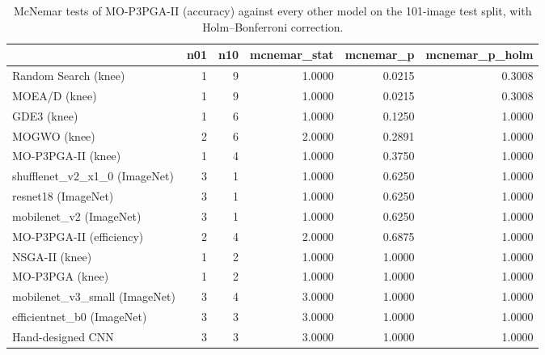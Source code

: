 \begin{table}[htbp]
\centering
\caption{McNemar tests of MO-P3PGA-II (accuracy) against every other model on the 101-image test split, with Holm--Bonferroni correction.}
\label{tab:mcnemar}
\footnotesize
\begin{tabular}{lrrrrr}
\toprule
 & n01 & n10 & mcnemar\_stat & mcnemar\_p & mcnemar\_p\_holm \\
\midrule
Random Search (knee) & 1 & 9 & 1.0000 & 0.0215 & 0.3008 \\
MOEA/D (knee) & 1 & 9 & 1.0000 & 0.0215 & 0.3008 \\
GDE3 (knee) & 1 & 6 & 1.0000 & 0.1250 & 1.0000 \\
MOGWO (knee) & 2 & 6 & 2.0000 & 0.2891 & 1.0000 \\
MO-P3PGA-II (knee) & 1 & 4 & 1.0000 & 0.3750 & 1.0000 \\
shufflenet\_v2\_x1\_0 (ImageNet) & 3 & 1 & 1.0000 & 0.6250 & 1.0000 \\
resnet18 (ImageNet) & 3 & 1 & 1.0000 & 0.6250 & 1.0000 \\
mobilenet\_v2 (ImageNet) & 3 & 1 & 1.0000 & 0.6250 & 1.0000 \\
MO-P3PGA-II (efficiency) & 2 & 4 & 2.0000 & 0.6875 & 1.0000 \\
NSGA-II (knee) & 1 & 2 & 1.0000 & 1.0000 & 1.0000 \\
MO-P3PGA (knee) & 1 & 2 & 1.0000 & 1.0000 & 1.0000 \\
mobilenet\_v3\_small (ImageNet) & 3 & 4 & 3.0000 & 1.0000 & 1.0000 \\
efficientnet\_b0 (ImageNet) & 3 & 3 & 3.0000 & 1.0000 & 1.0000 \\
Hand-designed CNN & 3 & 3 & 3.0000 & 1.0000 & 1.0000 \\
\bottomrule
\end{tabular}
\end{table}
